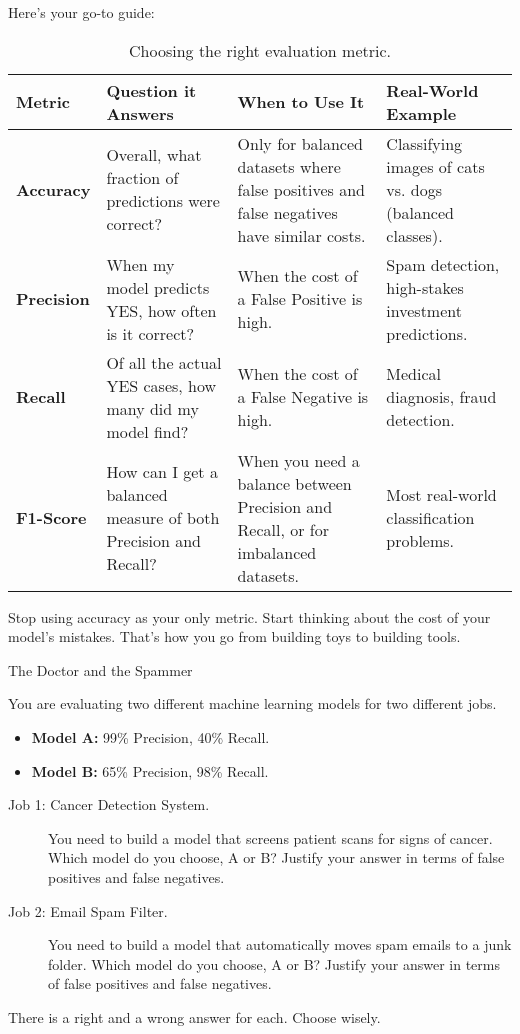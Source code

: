 \documentclass[11pt, letterpaper, openany]{book}
\begin{document}
Here's your go-to guide:
\begin{table}[h!]
\centering
\begin{tabular}{|p{2.5cm}|p{4.5cm}|p{3cm}|p{3.5cm}|}
\hline
\textbf{Metric} & \textbf{Question it Answers} & \textbf{When to Use It} & \textbf{Real-World Example} \\
\hline
\textbf{Accuracy} & Overall, what fraction of predictions were correct? & Only for balanced datasets where false positives and false negatives have similar costs. & Classifying images of cats vs. dogs (balanced classes). \\
\hline
\textbf{Precision} & When my model predicts YES, how often is it correct? & When the cost of a False Positive is high. & Spam detection, high-stakes investment predictions. \\
\hline
\textbf{Recall} & Of all the actual YES cases, how many did my model find? & When the cost of a False Negative is high. & Medical diagnosis, fraud detection. \\
\hline
\textbf{F1-Score} & How can I get a balanced measure of both Precision and Recall? & When you need a balance between Precision and Recall, or for imbalanced datasets. & Most real-world classification problems. \\
\hline
\end{tabular}
\caption{Choosing the right evaluation metric.}
\end{table}

Stop using accuracy as your only metric. Start thinking about the cost of your model's mistakes. That's how you go from building toys to building tools.

\begin{challengebox}
The Doctor and the Spammer

You are evaluating two different machine learning models for two different jobs.
\begin{itemize}
    \item \textbf{Model A:} 99\% Precision, 40\% Recall.
    \item \textbf{Model B:} 65\% Precision, 98\% Recall.
\end{itemize}
\begin{description}
    \item[Job 1: Cancer Detection System.] You need to build a model that screens patient scans for signs of cancer. Which model do you choose, A or B? Justify your answer in terms of false positives and false negatives.
    \item[Job 2: Email Spam Filter.] You need to build a model that automatically moves spam emails to a junk folder. Which model do you choose, A or B? Justify your answer in terms of false positives and false negatives.
\end{description}
There is a right and a wrong answer for each. Choose wisely.
\end{challengebox}
\end{document}
